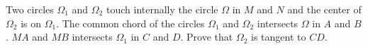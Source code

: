 Two circles $\Omega_{1}$ and $\Omega_{2}$ touch internally the circle $\Omega$ in $M$ and $N$ and the center of $\Omega_{2}$ is on $\Omega_{1}$. The common chord of the circles $\Omega_{1}$ and $\Omega_{2}$ intersects $\Omega$ in $A$ and $B$. $MA$ and $MB$ intersects $\Omega_{1}$ in $C$ and $D$. Prove that $\Omega_{2}$ is tangent to $CD$.
